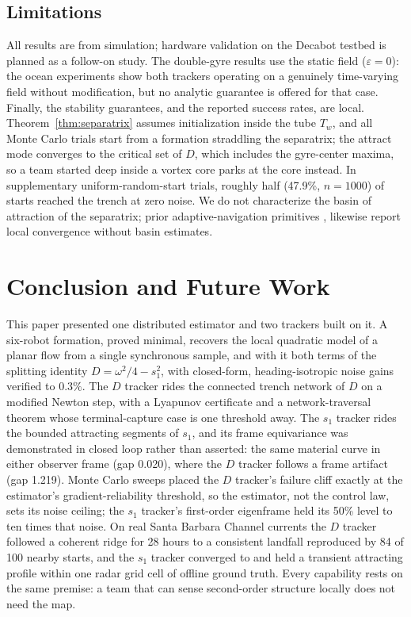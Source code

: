 \documentclass[lettersize,journal]{IEEEtran}
\begin{document}
\subsection{Limitations}
\label{sec:limitations}

All results are from simulation; hardware validation on the Decabot
testbed is planned as a follow-on study. The double-gyre results use
the static field ($\varepsilon = 0$): the ocean experiments show both
trackers operating on a genuinely time-varying field without
modification, but no analytic guarantee is offered for that case.
Finally, the stability guarantees, and the reported success rates, are
local. Theorem~\ref{thm:separatrix} assumes initialization inside the
tube $T_w$, and all Monte Carlo trials start from a formation
straddling the separatrix; the attract mode converges to the critical
set of $D$, which includes the gyre-center maxima, so a team started
deep inside a vortex core parks at the core instead. In supplementary
uniform-random-start trials, roughly half (47.9\%, $n = 1000$) of
starts reached the trench at zero noise. We do not characterize the
basin of attraction of the separatrix; prior adaptive-navigation
primitives \cite{27}, \cite{28} likewise report local convergence
without basin estimates.


\section{Conclusion and Future Work}
\label{sec:conclusion}
\label{sec:future}

This paper presented one distributed estimator and two trackers built
on it. A six-robot formation, proved minimal, recovers the local
quadratic model of a planar flow from a single synchronous sample, and
with it both terms of the splitting identity $D = \omega^2/4 - s_1^2$,
with closed-form, heading-isotropic noise gains verified to $0.3\%$.
The $D$ tracker rides the connected trench network of $D$ on a modified
Newton step, with a Lyapunov certificate and a network-traversal
theorem whose terminal-capture case is one threshold away. The $s_1$
tracker rides the bounded attracting segments of $s_1$, and its frame
equivariance was demonstrated in closed loop rather than asserted: the
same material curve in either observer frame (gap 0.020), where the $D$
tracker follows a frame artifact (gap 1.219). Monte Carlo sweeps placed
the $D$ tracker's failure cliff exactly at the estimator's
gradient-reliability threshold, so the estimator, not the control law,
sets its noise ceiling; the $s_1$ tracker's first-order eigenframe held
its 50\% level to ten times that noise. On real Santa Barbara Channel
currents the $D$ tracker followed a coherent ridge for 28 hours to a
consistent landfall reproduced by 84 of 100 nearby starts, and the
$s_1$ tracker converged to and held a transient attracting profile
within one radar grid cell of offline ground truth. Every capability
rests on the same premise: a team that can sense second-order structure
locally does not need the map.
\end{document}
